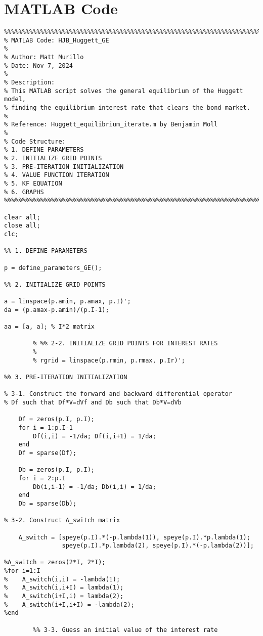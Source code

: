 \section*{MATLAB Code}
\begin{lstlisting}
%%%%%%%%%%%%%%%%%%%%%%%%%%%%%%%%%%%%%%%%%%%%%%%%%%%%%%%%%%%%%%%%%%%%%%%%%
% MATLAB Code: HJB_Huggett_GE
% 
% Author: Matt Murillo
% Date: Nov 7, 2024
%
% Description:
% This MATLAB script solves the general equilibrium of the Huggett model,
% finding the equilibrium interest rate that clears the bond market.
%
% Reference: Huggett_equilibrium_iterate.m by Benjamin Moll
%
% Code Structure:
% 1. DEFINE PARAMETERS
% 2. INITIALIZE GRID POINTS
% 3. PRE-ITERATION INITIALIZATION
% 4. VALUE FUNCTION ITERATION
% 5. KF EQUATION
% 6. GRAPHS
%%%%%%%%%%%%%%%%%%%%%%%%%%%%%%%%%%%%%%%%%%%%%%%%%%%%%%%%%%%%%%%%%%%%%%%%%

clear all;
close all;
clc;

%% 1. DEFINE PARAMETERS

p = define_parameters_GE();

%% 2. INITIALIZE GRID POINTS

a = linspace(p.amin, p.amax, p.I)';
da = (p.amax-p.amin)/(p.I-1);

aa = [a, a]; % I*2 matrix

        % %% 2-2. INITIALIZE GRID POINTS FOR INTEREST RATES
        % 
        % rgrid = linspace(p.rmin, p.rmax, p.Ir)';

%% 3. PRE-ITERATION INITIALIZATION

% 3-1. Construct the forward and backward differential operator 
% Df such that Df*V=dVf and Db such that Db*V=dVb

    Df = zeros(p.I, p.I);
    for i = 1:p.I-1
        Df(i,i) = -1/da; Df(i,i+1) = 1/da;
    end
    Df = sparse(Df);

    Db = zeros(p.I, p.I);
    for i = 2:p.I
        Db(i,i-1) = -1/da; Db(i,i) = 1/da;
    end
    Db = sparse(Db);

% 3-2. Construct A_switch matrix

    A_switch = [speye(p.I).*(-p.lambda(1)), speye(p.I).*p.lambda(1);
                speye(p.I).*p.lambda(2), speye(p.I).*(-p.lambda(2))];

%A_switch = zeros(2*I, 2*I);
%for i=1:I
%    A_switch(i,i) = -lambda(1);
%    A_switch(i,i+I) = lambda(1);
%    A_switch(i+I,i) = lambda(2);
%    A_switch(i+I,i+I) = -lambda(2);
%end

        %% 3-3. Guess an initial value of the interest rate


\end{lstlisting}
